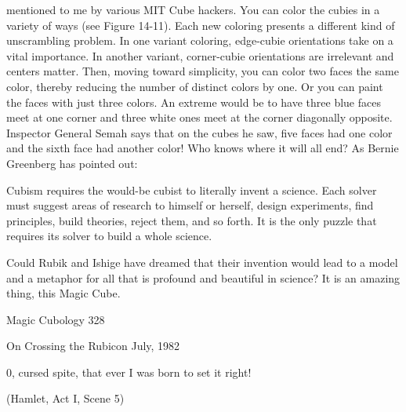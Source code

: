 mentioned to me by various MIT Cube hackers. You can color the cubies in a variety
of ways (see Figure 14-11). Each new coloring presents a different kind of
unscrambling problem. In one variant coloring, edge-cubie orientations take on a vital
importance. In another variant, corner-cubie orientations are irrelevant and centers
matter. Then, moving toward simplicity, you can color two faces the same color,
thereby reducing the number of distinct colors by one. Or you can paint the faces with
just three colors. An extreme would be to have three blue faces meet at one corner and
three white ones meet at the corner diagonally opposite. Inspector General Semah
says that on the cubes he saw, five faces had one color and the sixth face had another
color!
        Who knows where it will all end? As Bernie Greenberg has pointed out:

           Cubism requires the would-be cubist to literally invent a science. Each solver
  must suggest areas of research to himself or herself, design experiments, find
  principles, build theories, reject them, and so forth. It is the only puzzle that requires its
  solver to build a whole science.

      Could Rubik and Ishige have dreamed that their invention would lead to a
model and a metaphor for all that is profound and beautiful in science? It is an
amazing thing, this Magic Cube.




Magic Cubology                                                                                 328

                       On Crossing the Rubicon
                                      July, 1982

                                                          0, cursed spite,
                                                    that ever I was born to set it right!

                                                               (Hamlet, Act I, Scene 5)




